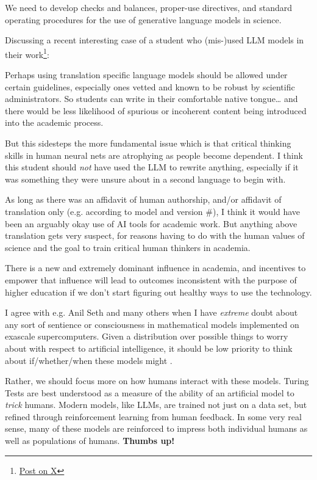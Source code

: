 \documentclass[11pt, oneside]{article}   	%
\begin{document}
We need to develop checks and balances, proper-use directives, and standard operating procedures for the use of generative language models in science.

Discussing a recent interesting case of a student who (mis-)used LLM models in their work\footnote{\href{https://twitter.com/BeebsMemes/status/1759282741680443600}{Post on X}}:

Perhaps using translation specific language models should be allowed under certain guidelines, especially ones vetted and known to be robust by scientific administrators. So students can write in their comfortable native tongue… and there would be less likelihood of spurious or incoherent content being introduced into the academic process.

But this sidesteps the more fundamental  issue which is that critical thinking skills in human neural nets are atrophying as people become dependent.  I think this student should \emph{not} have used the LLM to rewrite anything, especially if it was something they were unsure about in a second language to begin with. 

As long as there was an affidavit of human authorship, and/or affidavit of translation only (e.g. according to model and version \#), I think it would have been an arguably okay use of AI tools for academic work. But anything above translation gets very suspect, for reasons having to do with the human values of science and the goal to train critical human thinkers in academia.

There is a new and extremely dominant influence in academia, and incentives to empower that influence will lead to outcomes inconsistent with the purpose of higher education if we don’t start figuring out healthy ways to use the technology.

I agree with e.g. Anil Seth and many others when I have \emph{extreme} doubt about any sort of sentience or consciousness in mathematical models implemented on exascale supercomputers.  Given a distribution over possible things to worry about with respect to artificial intelligence, it should be low priority to think about if/whether/when these models might .

Rather, we should focus more on how humans interact with these models.  Turing Tests are best understood as a measure of the ability of an artificial model to \emph{trick} humans.  Modern models, like LLMs, are trained not just on a data set, but refined through reinforcement learning from human feedback. In some very real sense, many of these models are reinforced to impress both individual humans as well as populations of humans.  \textbf{Thumbs up!}
\end{document}
